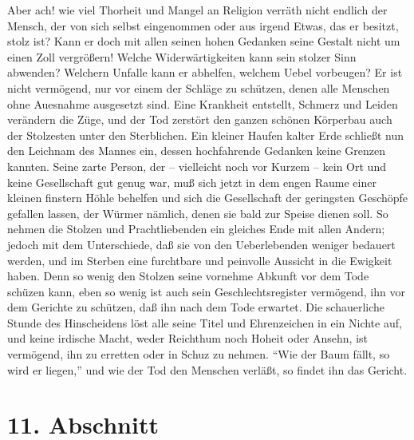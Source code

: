 Aber ach! wie viel Thorheit und Mangel an Religion verräth nicht endlich der
Mensch, der von sich selbst eingenommen oder aus irgend Etwas, das er besitzt,
stolz ist? Kann er doch mit allen seinen hohen Gedanken seine Gestalt nicht um
einen Zoll vergrößern! Welche Widerwärtigkeiten kann sein stolzer Sinn abwenden?
Welchern Unfalle kann er abhelfen, welchem Uebel vorbeugen? Er ist nicht
vermögend, nur vor einem der Schläge zu schützen, denen alle Menschen ohne
Auesnahme ausgesetzt sind. Eine Krankheit entstellt, Schmerz und Leiden
verändern die Züge, und der Tod zerstört den ganzen schönen Körperbau auch der
Stolzesten unter den Sterblichen. Ein kleiner Haufen kalter Erde schließt nun
den Leichnam des Mannes ein, dessen hochfahrende Gedanken keine Grenzen kannten.
Seine zarte Person, der -- vielleicht noch vor Kurzem -- kein Ort und keine
Gesellschaft gut genug war, muß sich jetzt in dem engen Raume einer kleinen
finstern Höhle behelfen und sich die Gesellschaft der geringsten Geschöpfe
gefallen lassen, der Würmer nämlich, denen sie bald zur Speise dienen soll. So
nehmen die Stolzen und Prachtliebenden ein gleiches Ende mit allen Andern;
jedoch mit dem Unterschiede, daß sie von den Ueberlebenden weniger bedauert
werden, und im Sterben eine furchtbare und peinvolle Aussicht in die Ewigkeit
haben. Denn so wenig den Stolzen seine vornehme Abkunft vor dem Tode schüzen
kann, eben so wenig ist auch sein Geschlechtsregister vermögend, ihn vor dem
Gerichte zu schützen, daß ihn nach dem Tode erwartet. Die schauerliche Stunde
des Hinscheidens löst alle seine Titel und Ehrenzeichen in ein Nichte auf, und
keine irdische Macht, weder Reichthum noch Hoheit oder Ansehn, ist vermögend,
ihn zu erretten oder in Schuz zu nehmen. "`Wie der Baum fällt, so wird er
liegen,"' und wie der Tod den Menschen verläßt, so findet ihn das Gericht.

\section{11. Abschnitt}

